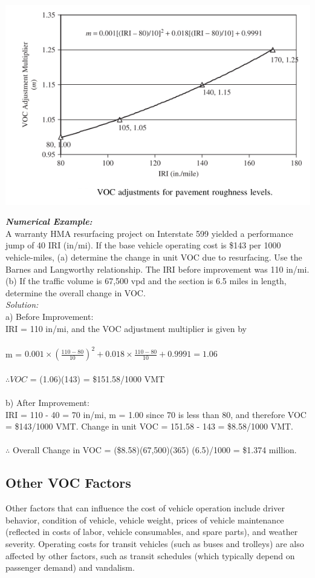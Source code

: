 \begin{center}
	\includegraphics[scale=0.6]{gfx/fig69.png}
\end{center}
\textbf{\textit{Numerical Example:}}\\
A warranty HMA resurfacing project on Interstate 599 yielded a performance jump of 40 IRI (in/mi). If the base vehicle operating cost is \$143 per 1000 vehicle-miles, (a) determine the change in unit VOC due to resurfacing. Use the Barnes and Langworthy relationship. The IRI before improvement was 110 in/mi. (b) If the traffic volume is 67,500 vpd and the section is 6.5 miles in length, determine the overall change in VOC.\\
\textit{Solution:}\\
a) Before Improvement:\\
IRI = 110 in/mi, and the VOC adjustment multiplier is given by\\\\
m = $ 0.001 \times \left( \frac{110 - 80}{10} \right)^2 + 0.018 \times \frac{110 - 80}{10} + 0.9991 = 1.06$ \\\\
$ \therefore VOC $ = (1.06)(143) = \$151.58/1000 VMT\\\\
b) After Improvement:\\
IRI = 110 - 40 = 70 in/mi, m = 1.00 since 70 is less than 80, and therefore VOC = \$143/1000 VMT. Change
in unit VOC = 151.58 - 143 = \$8.58/1000 VMT.\\\\
$ \therefore $ Overall Change in VOC = (\$8.58)(67,500)(365) (6.5)/1000 = \$1.374 million.
%
\subsection{Other VOC Factors}
Other factors that can influence the cost of vehicle
operation include driver behavior, condition of vehicle, vehicle weight, prices of vehicle maintenance (reflected in costs of labor, vehicle consumables, and spare parts), and weather severity. Operating costs for transit vehicles (such as buses and trolleys) are also affected by other factors, such as transit schedules (which typically depend on passenger demand) and vandalism.
